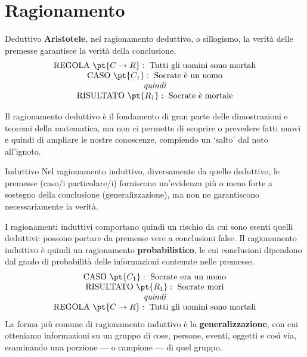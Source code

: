 \section{Ragionamento}\label{sub:ragionamento} %
\begin{definition}{Deduttivo}{}
    \textbf{Aristotele}, nel ragionamento deduttivo, o sillogismo, la verità delle premesse garantisce la verità della conclusione.
    \[
        \begin{matrix}
            \text{REGOLA } \pt{C \to R}: \text{ Tutti gli uomini sono mortali} \\
            \text{CASO } \pt{C_1}: \text{ Socrate è un uomo} \\
            \textit{quindi} \\
            \text{RISULTATO } \pt{R_1}: \text{ Socrate è mortale} \\
        \end{matrix}
    \]
\end{definition}
Il ragionamento deduttivo è il fondamento di gran parte delle dimostrazioni e teoremi della matematica, ma non ci permette di scoprire o prevedere fatti nuovi e quindi di ampliare le nostre conoscenze, compiendo un `salto' dal noto all'ignoto.
\begin{definition}{Induttivo}{}
    Nel ragionamento induttivo, diversamente da quello deduttivo, le premesse (caso/i particolare/i) forniscono un'evidenza più o meno forte a sostegno della conclusione (generalizzazione), ma non ne garantiscono necessariamente la verità.
\end{definition}
I ragionamenti induttivi comportano quindi un rischio da cui sono esenti quelli deduttivi: possono portare da premesse vere a conclusioni false.
Il ragionamento induttivo è quindi un ragionamento \textbf{probabilistico}, le cui conclusioni dipendono dal grado di probabilità delle informazioni contenute nelle premesse.
\[
    \begin{matrix}
        \text{CASO } \pt{C_1}: \text{ Socrate era un uomo} \\
        \text{RISULTATO } \pt{R_1}: \text{ Socrate morì} \\
        \textit{quindi} \\
        \text{REGOLA } \pt{C \to R}: \text{ Tutti gli uomini sono mortali} \\
    \end{matrix}
\]
La forma più comune di ragionamento induttivo è la \textbf{generalizzazione}, con cui otteniamo informazioni su un gruppo di cose, persone, eventi, oggetti e così via, esaminando una porzione --- o campione --- di quel gruppo.
